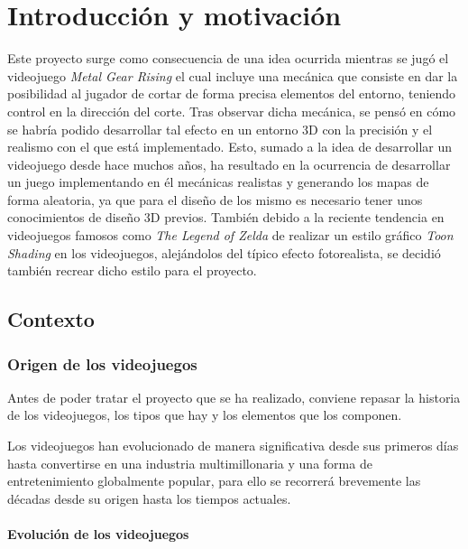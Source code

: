 \chapter{Introducción y motivación}

Este proyecto surge como consecuencia de una idea ocurrida mientras se jugó el videojuego \textit{Metal Gear Rising} el cual incluye una mecánica que consiste en dar la posibilidad al jugador de cortar de forma precisa elementos del entorno, teniendo control en la dirección del corte. Tras observar dicha mecánica, se pensó en cómo se habría podido desarrollar tal efecto en un entorno 3D con la precisión y el realismo con el que está implementado. Esto, sumado a la idea de desarrollar un videojuego desde hace muchos años, ha resultado en la ocurrencia de desarrollar un juego implementando en él mecánicas realistas y generando los mapas de forma aleatoria, ya que para el diseño de los mismo es necesario tener unos conocimientos de diseño 3D previos. También debido a la reciente tendencia en videojuegos famosos como \textit{The Legend of Zelda} de realizar un estilo gráfico \textit{Toon Shading} en los videojuegos, alejándolos del típico efecto fotorealista, se decidió también recrear dicho estilo para el proyecto. 

\section{Contexto}

\subsection{Origen de los videojuegos}

Antes de poder tratar el proyecto que se ha realizado, conviene repasar la historia de los videojuegos, los tipos que hay y los elementos que los componen.

Los videojuegos han evolucionado de manera significativa desde sus primeros días hasta convertirse en una industria multimillonaria y una forma de entretenimiento globalmente popular, para ello se recorrerá brevemente las décadas desde su origen hasta los tiempos actuales.

\subsubsection{Evolución de los videojuegos}

